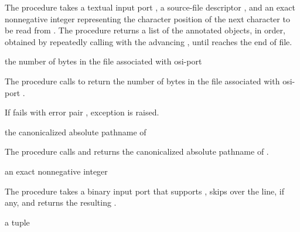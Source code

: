 The  procedure takes a textual input
port , a source-file descriptor , and an exact
nonnegative integer  representing the character position of
the next character to be read from . The procedure returns a
list of the annotated objects, in order, obtained by repeatedly
calling  with the advancing ,
until  reaches the end of file.

\begin{procedure}
\end{procedure}
\returns{} the number of bytes in the file associated with osi-port 

The  procedure calls 
to return the number of bytes in the file associated with osi-port
.

If  fails with error pair , exception  is raised.

\begin{procedure}
\end{procedure}
\returns{} the canonicalized absolute pathname of 

The  procedure calls 
and returns the canonicalized absolute pathname of .

\begin{procedure}
\end{procedure}
\returns{} an exact nonnegative integer

The  procedure takes a binary input port
 that supports , skips over the
 line, if any, and returns the
resulting .

\begin{procedure}
\end{procedure}
\returns{} a  tuple


